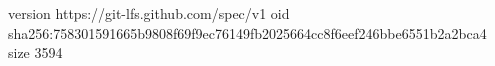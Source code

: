 version https://git-lfs.github.com/spec/v1
oid sha256:758301591665b9808f69f9ec76149fb2025664cc8f6eef246bbe6551b2a2bca4
size 3594
